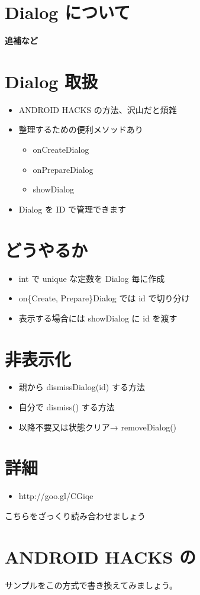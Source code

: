 \documentclass[slide,papersize]{jsarticle}
\begin{document}
\section*{Dialog について}
\vspace*{15mm}
\begin{center}
{\Huge {\bf 追補など}}
\end{center}

\section*{Dialog 取扱}
\bigskip
\begin{itemize}
\item ANDROID HACKS の方法、沢山だと煩雑
\bigskip
\item 整理するための便利メソッドあり
 \begin{itemize}
 \item onCreateDialog
 \item onPrepareDialog
 \item showDialog
 \end{itemize}
\item Dialog を ID で管理できます
\end{itemize}

\section*{どうやるか}
\bigskip
\begin{itemize}
\item int で unique な定数を Dialog 毎に作成
\bigskip
\item on\{Create, Prepare\}Dialog では id で切り分け
\bigskip
\item 表示する場合には showDialog に id を渡す
\end{itemize}

\section*{非表示化}
\bigskip
\begin{itemize}
\item 親から dismissDialog(id) する方法
\bigskip
\item 自分で dismiss() する方法
\bigskip
\item 以降不要又は状態クリア→ removeDialog()
\end{itemize}

\section*{詳細}
\bigskip
\begin{itemize}
\item http://goo.gl/CGiqe
\end{itemize}
こちらをざっくり読み合わせましょう

\section*{ANDROID HACKS の}
\bigskip
サンプルをこの方式で書き換えてみましょう。
\end{document}
